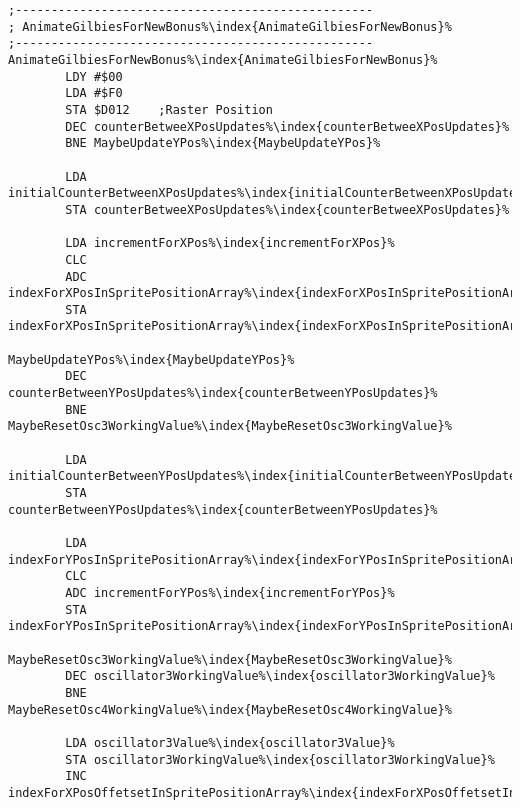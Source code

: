 \begin{minipage}[b]{0.45\linewidth}
\centering
{}%

\end{minipage}
\hspace{0.5cm}
\begin{minipage}[b]{0.45\linewidth}
\centering
\begin{lstlisting}[basicstyle=\tiny,caption=... and Iridis Alpha.,escapechar=\%]
;--------------------------------------------------
; AnimateGilbiesForNewBonus%\index{AnimateGilbiesForNewBonus}%
;--------------------------------------------------
AnimateGilbiesForNewBonus%\index{AnimateGilbiesForNewBonus}%
        LDY #$00
        LDA #$F0
        STA $D012    ;Raster Position
        DEC counterBetweeXPosUpdates%\index{counterBetweeXPosUpdates}%
        BNE MaybeUpdateYPos%\index{MaybeUpdateYPos}%

        LDA initialCounterBetweenXPosUpdates%\index{initialCounterBetweenXPosUpdates}%
        STA counterBetweeXPosUpdates%\index{counterBetweeXPosUpdates}%

        LDA incrementForXPos%\index{incrementForXPos}%
        CLC
        ADC indexForXPosInSpritePositionArray%\index{indexForXPosInSpritePositionArray}%
        STA indexForXPosInSpritePositionArray%\index{indexForXPosInSpritePositionArray}%

MaybeUpdateYPos%\index{MaybeUpdateYPos}%   
        DEC counterBetweenYPosUpdates%\index{counterBetweenYPosUpdates}%
        BNE MaybeResetOsc3WorkingValue%\index{MaybeResetOsc3WorkingValue}%

        LDA initialCounterBetweenYPosUpdates%\index{initialCounterBetweenYPosUpdates}%
        STA counterBetweenYPosUpdates%\index{counterBetweenYPosUpdates}%

        LDA indexForYPosInSpritePositionArray%\index{indexForYPosInSpritePositionArray}%
        CLC
        ADC incrementForYPos%\index{incrementForYPos}%
        STA indexForYPosInSpritePositionArray%\index{indexForYPosInSpritePositionArray}%

MaybeResetOsc3WorkingValue%\index{MaybeResetOsc3WorkingValue}%   
        DEC oscillator3WorkingValue%\index{oscillator3WorkingValue}%
        BNE MaybeResetOsc4WorkingValue%\index{MaybeResetOsc4WorkingValue}%

        LDA oscillator3Value%\index{oscillator3Value}%
        STA oscillator3WorkingValue%\index{oscillator3WorkingValue}%
        INC indexForXPosOffetsetInSpritePositionArray%\index{indexForXPosOffetsetInSpritePositionArray}%


\end{lstlisting}
\end{minipage}
